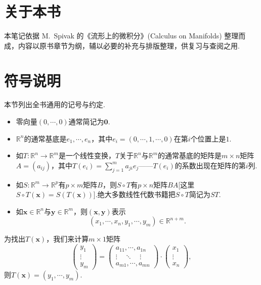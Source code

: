 \section{关于本书}

本笔记依据 M.\ Spivak 的《流形上的微积分》(Calculus on Manifolds) 整理而成，内容以原书章节为纲，辅以必要的补充与排版整理，供复习与查阅之用.

\section{符号说明}

本节列出全书通用的记号与约定.

\begin{itemize}
    \item 零向量$(0,\cdots,0)$通常简记为$\mathbf{0}$.
    \item $\mathbb{R}^n$的通常基底是$e_1,\cdots,e_n$，其中$e_i=(0,\cdots,1,\cdots,0)$在第$i$个位置上是$1$.
    \item 如$T:\mathbb{R}^n\to\mathbb{R}^m$是一个线性变换，$T$关于$\mathbb{R}^n$与$\mathbb{R}^m$的通常基底的矩阵是$m\times n$矩阵$A=(a_{ij})$，其中$T(e_i)=\sum_{j=1}^m a_{ji}e_j$——$T(e_i)$的系数出现在矩阵的第$i$列.
    \item 如$S:\mathbb{R}^m\to\mathbb{R}^p$有$p\times m$矩阵$B$，则$S\circ T$有$p\times n$矩阵$BA$[这里$S\circ T(\mathbf{x})=S(T(\mathbf{x}))$].绝大多数线性代数书籍把$S\circ T$简记为$ST$.
    \item 如$\mathbf{x}\in\mathbb{R}^n$与$\mathbf{y}\in\mathbb{R}^m$，则$(\mathbf{x},\mathbf{y})$表示
    $$(x_1,\cdots,x_n,y_1,\cdots,y_m)\in\mathbb{R}^{n+m}.$$
\end{itemize}

为找出$T(\mathbf{x})$，我们来计算$m\times 1$矩阵
$$\begin{pmatrix}
    y_1\\
    \vdots\\
    y_m
\end{pmatrix}
=
\begin{pmatrix}
    a_{11},\cdots,a_{1n}\\
    \vdots\quad\ddots\quad\vdots\\
    a_{m1},\cdots,a_{mn}
\end{pmatrix}
\cdot
\begin{pmatrix}
    x_1\\
    \vdots\\
    x_n
\end{pmatrix},$$
则$T(\mathbf{x})=(y_1,\cdots,y_m)$.
